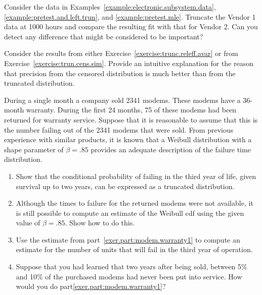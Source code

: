 

\begin{exercise}
\label{exercise:vendor1.trun}
Consider the data in Examples~\ref{example:electronic.subsystem.data},
\ref{example:pretest.and.left.trun},
and \ref{example:pretest.mle}. Truncate the Vendor 1 data at 1000
hours and compare the resulting fit with that for Vendor 2. Can you
detect any difference that might be considered to be important?
\end{exercise}


\begin{exercise}
Consider the results from either
Exercise~\ref{exercise:trunc.releff.avar} or from
Exercise~\ref{exercise:trun.cens.sim}. Provide an intuitive
explanation for the reason that precision from the censored
distribution is much better than from the truncated distribution.
\end{exercise}

\begin{exercise}
During a single month a company sold 2341 modems.  These modems have
a 36-month warranty. During the first 24 months, 75 of these modems
had been returned for warranty service.  Suppose that it is
reasonable to assume that this is the number failing out of the 2341
modems that were sold.  From previous experience with similar
products, it is known that a Weibull distribution with a shape
parameter of $\beta=.85$ provides an adequate description of the
failure time distribution.
\begin{enumerate}
\item
Show that the conditional probability of failing in the third year
of life, given survival up to two years, can be expressed as a
truncated distribution.
\item
\label{exer.part:modem.warranty1}
Although the times to failure for the returned modems were not
available, it is still possible to compute an estimate of the
Weibull cdf using the given value of $\beta=.85$.  Show how to do
this.
\item
Use the estimate from part~\ref{exer.part:modem.warranty1}
to compute an estimate for the number of units that will fail
in the third year of operation.
\item
Suppose that you had learned that two years after being sold,
between 5\% and 10\% of the purchased modems had never been put into service.
How would you do part\ref{exer.part:modem.warranty1}?
\end{enumerate}
\end{exercise}

